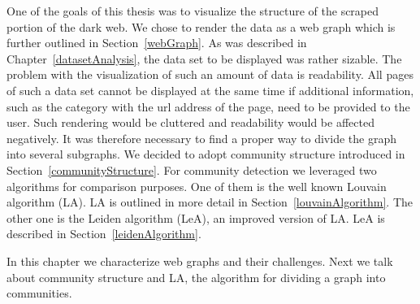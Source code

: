 \label{clustering}
One of the goals of this thesis was to visualize the structure of the scraped portion of the dark web. We chose to render the data as a web graph which is further outlined in Section~\ref{webGraph}. As was described in Chapter~\ref{datasetAnalysis}, the data set to be displayed was rather sizable. The problem with the visualization of such an amount of data is readability. All pages of such a data set cannot be displayed at the same time if additional information, such as the category with the url address of the page, need to be provided to the user. Such rendering would be cluttered and readability would be affected negatively. It was therefore necessary to find a proper way to divide the graph into several subgraphs. We decided to adopt community structure introduced in Section~\ref{communityStructure}. For community detection we leveraged two algorithms for comparison purposes. One of them is the well known Louvain algorithm (LA). LA is outlined in more detail in Section~\ref{louvainAlgorithm}. The other one is the Leiden algorithm (LeA), an improved version of LA. LeA is described in Section~\ref{leidenAlgorithm}.

In this chapter we characterize web graphs and their challenges. Next we talk about community structure and LA, the algorithm for dividing a graph into communities. 
 
